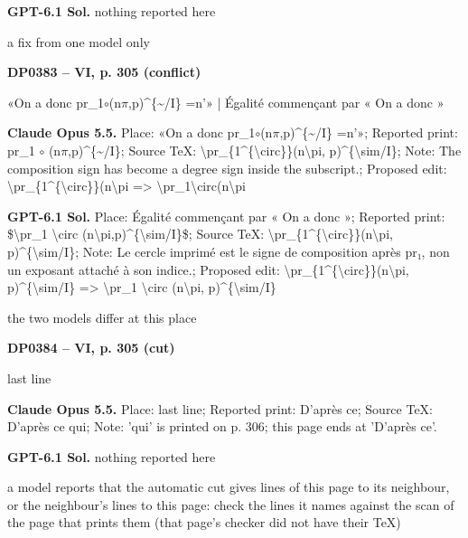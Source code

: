 \textbf{GPT-6.1 Sol.} nothing reported here\par
a fix from one model only\par
\par\noindent\hypertarget{DP0383}{}\textbf{DP0383 -- VI, p. 305 (conflict)}\par
«On a donc pr\_1\ensuremath{\circ}(n\ensuremath{\pi},p)\textasciicircum{}\{\textasciitilde{}/I\} =\allowbreak  n'» | Égalité commençant par « On a donc »\par
\textbf{Claude Opus 5.5.} Place: «On a donc pr\_1\ensuremath{\circ}(n\ensuremath{\pi},p)\textasciicircum{}\{\textasciitilde{}/I\} =\allowbreak  n'»; Reported print: pr\_1 \ensuremath{\circ} (n\ensuremath{\pi},p)\textasciicircum{}\{\textasciitilde{}/I\}; Source TeX: \textbackslash{}pr\_\{1\textasciicircum{}\{\textbackslash{}circ\}\}(n\textbackslash{}pi, p)\textasciicircum{}\{\textbackslash{}sim/I\}; Note: The composition sign has become a degree sign inside the subscript.; Proposed edit: \textbackslash{}pr\_\{1\textasciicircum{}\{\textbackslash{}circ\}\}(n\textbackslash{}pi =\allowbreak > \textbackslash{}pr\_1\textbackslash{}circ(n\textbackslash{}pi\par
\textbf{GPT-6.1 Sol.} Place: Égalité commençant par « On a donc »; Reported print: \$\textbackslash{}pr\_1 \textbackslash{}circ (n\textbackslash{}pi,p)\textasciicircum{}\{\textbackslash{}sim/I\}\$; Source TeX: \textbackslash{}pr\_\{1\textasciicircum{}\{\textbackslash{}circ\}\}(n\textbackslash{}pi, p)\textasciicircum{}\{\textbackslash{}sim/I\}; Note: Le cercle imprimé est le signe de composition après pr₁, non un exposant attaché à son indice.; Proposed edit: \textbackslash{}pr\_\{1\textasciicircum{}\{\textbackslash{}circ\}\}(n\textbackslash{}pi, p)\textasciicircum{}\{\textbackslash{}sim/I\} =\allowbreak > \textbackslash{}pr\_1 \textbackslash{}circ (n\textbackslash{}pi, p)\textasciicircum{}\{\textbackslash{}sim/I\}\par
the two models differ at this place\par
\par\noindent\hypertarget{DP0384}{}\textbf{DP0384 -- VI, p. 305 (cut)}\par
last line\par
\textbf{Claude Opus 5.5.} Place: last line; Reported print: D'après ce; Source TeX: D'après ce qui; Note: 'qui' is printed on p. 306; this page ends at 'D'après ce'.\par
\textbf{GPT-6.1 Sol.} nothing reported here\par
a model reports that the automatic cut gives lines of this page to its neighbour, or the neighbour's lines to this page: check the lines it names against the scan of the page that prints them (that page's checker did not have their TeX)\par
